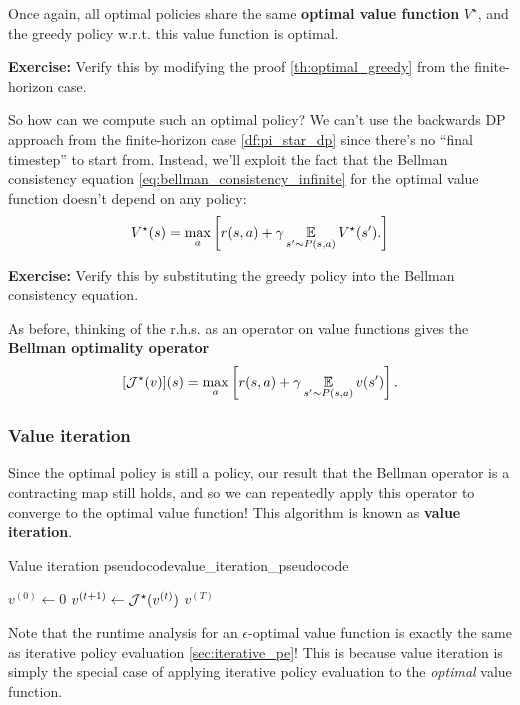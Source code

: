 \documentclass[\main/main]{subfiles}
\begin{document}
Once again, all optimal policies share the same \textbf{optimal value function} $V^\star$, and the greedy policy w.r.t. this value function is optimal.

\textbf{Exercise:} Verify this by modifying the proof \ref{th:optimal_greedy} from the finite-horizon case.

So how can we compute such an optimal policy? We can't use the backwards DP approach from the finite-horizon case \eqref{df:pi_star_dp} since there's no ``final timestep'' to start from. Instead, we'll exploit the fact that the Bellman consistency equation \eqref{eq:bellman_consistency_infinite} for the optimal value function doesn't depend on any policy:
\[
    V^\star(s) = \max_a \left[ r(s, a) + \gamma \operatorname*{\mathbb{E}}_{s' \sim P(s, a)} V^\star(s'). \right]
\]

\textbf{Exercise:} Verify this by substituting the greedy policy into the Bellman consistency equation.

As before, thinking of the r.h.s. as an operator on value functions gives the \textbf{Bellman optimality operator}
\[
    [\mathcal{J}^{\star}(v)](s) = \max_a \left[ r(s, a) + \gamma \operatorname*{\mathbb{E}}_{s' \sim P(s, a)} v(s') \right].
\]

\subsubsection{Value iteration}

Since the optimal policy is still a policy, our result that the Bellman operator is a contracting map still holds, and so we can repeatedly apply this operator to converge to the optimal value function! This algorithm is known as \textbf{value iteration}.

\begin{definition}{Value iteration pseudocode}{value_iteration_pseudocode}
    \begin{algorithmic}
        \State $v^{(0)} \gets 0$
            \State $v^{(t+1)} \gets \mathcal{J}^{\star}(v^{(t)})$
        \EndFor
        \State \Return $v^{(T)}$
    \end{algorithmic}
\end{definition}

Note that the runtime analysis for an $\epsilon$-optimal value function is exactly the same as iterative policy evaluation \eqref{sec:iterative_pe}! This is because value iteration is simply the special case of applying iterative policy evaluation to the \emph{optimal} value function.
\end{document}
